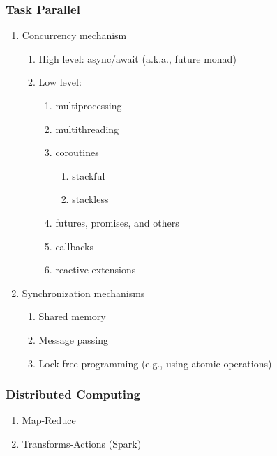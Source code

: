 \documentclass{article}
\begin{document}
\subsubsection{Task Parallel}
\begin{enumerate}
    \item Concurrency mechanism
    \begin{enumerate}
        \item High level: async/await (a.k.a., future monad)
        \item Low level:
        \begin{enumerate}
            \item multiprocessing
            \item multithreading
            \item coroutines
            \begin{enumerate}
                \item stackful
                \item stackless
            \end{enumerate}
            \item futures, promises, and others
            \item callbacks
            \item reactive extensions
        \end{enumerate}
    \end{enumerate}
    \item Synchronization mechanisms
    \begin{enumerate}
        \item Shared memory
        \item Message passing
        \item Lock-free programming (e.g., using atomic operations)
    \end{enumerate}
\end{enumerate}
\subsubsection{Distributed Computing}
\begin{enumerate}
    \item Map-Reduce
    \item Transforms-Actions (Spark)
\end{enumerate}
\end{document}
